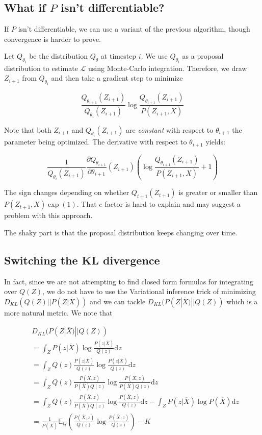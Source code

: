 \documentclass{article}
\begin{document}
\subsection{What if \(P\) isn't differentiable?}

If \(P\) isn't differentiable, we can use a variant of the previous algorithm,
though convergence is harder to prove.

Let \(Q_{\theta_i}\) be the distribution \(Q_{\theta}\) at timestep \(i\).
We use \(Q_{\theta_i}\) as a proposal distribution to estimate \(\mathcal{L}\)
using Monte-Carlo integration. Therefore, we draw \(Z_{i+1}\) from
\(Q_{\theta_i}\) and then take a gradient step to minimize

\[
  \frac{Q_{\theta_{i+1}}(Z_{i+1})}{Q_{\theta_i}(Z_{i+1})} \log
  \frac{Q_{\theta_{i+1}}(Z_{i+1})}{P(Z_{i+1},X)}
\]

Note that both \(Z_{i+1}\) and \(Q_{\theta_i}(Z_{i+1})\) are \emph{constant}
with respect to \(\theta_{i+1}\) the parameter being optimized. The derivative
with respect to \(\theta_{i+1}\) yields:

\[
  \frac{1}{Q_{\theta_i}(Z_{i+1})}
    \frac{\partial Q_{\theta_{i+1}}}{\partial \theta_{i+1}}(Z_{i+1})
    \left( \log \frac{Q_{\theta_{i+1}}(Z_{i+1})}{P(Z_{i+1},X)} + 1 \right)
\]

The sign changes depending on whether \(Q_{t+1}(Z_{t+1})\) is greater or
smaller than \(P(Z_{t+1},X) \exp(1)\). That \(e\) factor is hard
to explain and may suggest a problem with this approach.

The shaky part is that the proposal distribution keeps changing over time.

\subsection{Switching the KL divergence}

In fact, since we are not attempting to find closed form formulas for
integrating over \(Q(Z)\), we do not have to use the Variational inference
trick of minimizing \(D_{KL}(Q(Z)||P(Z|\overline{X}))\) and we can tackle
\(D_{KL}(P(Z|\overline{X})||Q(Z))\) which is a more natural metric. We note that

\[
\begin{aligned}
  & D_{KL}(P(Z|\overline{X})|| Q(Z)) \\
  &= \int_Z P(z|\overline{X}) \log \frac{P(z|\overline{X})}{Q(z)} \mathrm{d}z \\
  &= \int_Z Q(z) \frac{P(z|\overline{X})}{Q(z)} \log \frac{P(z|\overline{X})}{Q(z)}  \mathrm{d}z \\
  &= \int_Z Q(z) \frac{P(\overline{X}, z)}{P(\overline{X})Q(z)} \log \frac{P(\overline{X}, z)}{P(\overline{X})Q(z)}  \mathrm{d}z \\
  &= \int_Z Q(z) \frac{P(\overline{X}, z)}{P(\overline{X})Q(z)} \log \frac{P(\overline{X}, z)}{Q(z)}  \mathrm{d}z
  - \int_Z P(z|\overline{X}) \log P(\overline{X})  \mathrm{d}z \\
  &= \frac{1}{P(\overline{X})}\mathbb{E}_{Q} \left( \frac{P(\overline{X}, z)}{Q(z)} \log \frac{P(\overline{X}, z)}{Q(z)}\right) - K
\end{aligned}
\]
\end{document}
